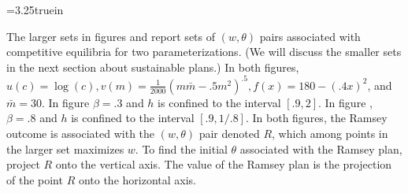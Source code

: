 \centerline{\epsfxsize=3.25truein}
\caption{Sets of $(w, \theta)$ pairs  associated with competitive equilibria (the larger set) and with sustainable plans (the smaller set) for $\beta = .8$   The Ramsey plan is associated with the $(w, \theta)$ pair
 denoted  $R$,  which among points in the larger set maximizes $w$. Attaining $R$ requires an initial $\theta$ equal to the projection of $R$ onto the vertical axis.}
\endfigure


The larger sets in
figures   and  report sets of $(w,\theta)$ pairs associated with competitive equilibria for two parameterizations.
(We will discuss the smaller sets in the next section about sustainable plans.)
In both figures, $ u(c) = \log (c),   v(m) = {\frac{1}{2000} }(m \bar m - .5m^2)^{.5}, f(x) =180 - (.4x)^2$, and $\bar m = 30$. In figure  $\beta = .3$ and $h$ is confined to the interval $[.9, 2]$.  In figure , $\beta = .8$ and $h$ is confined to the interval
$[.9, 1/.8]$.    In both figures, the Ramsey outcome is associated   with the $(w,\theta)$ pair
denoted $R$, which among points in the larger set maximizes $w$. To find the  initial $\theta$ associated with the Ramsey plan, project $R$ onto the vertical axis. The value of the Ramsey plan is the projection of the point $R$ onto the horizontal axis.
%
%


%

\newpage


